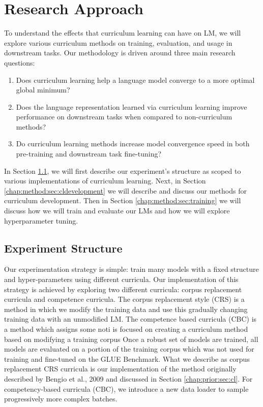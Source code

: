 \chapter{Research Approach}
\label{chap:method}
To understand the effects that curriculum learning can have on LM, we will explore various curriculum methods on training, evaluation, and usage in downstream tasks. 
Our methodology is driven around three main research questions:
\begin{enumerate}
\item Does curriculum learning help a language model converge to a more optimal global minimum? 
\item Does the language representation learned via curriculum learning improve performance on downstream tasks when compared to non-curriculum methods?
\item  Do curriculum learning methods increase model convergence speed in both pre-training and downstream task fine-tuning?
\end{enumerate}
In Section \ref{chap:method:sec:structure}, we will first describe our experiment's structure as scoped to various implementations of curriculum learning. Next, in Section \ref{chap:method:sec:cldevelopment} we will describe and discuss our methods for curriculum development. Then in Section \ref{chap:method:sec:training} we will discuss how we will train and evaluate our LMs and how we will explore hyperparameter tuning.
\section{Experiment Structure}
\label{chap:method:sec:structure}
Our experimentation strategy is simple: train many models with a fixed structure and hyper-parameters using different curricula. Our implementation of this strategy is achieved by exploring two different curricula: corpus replacement curricula and competence curricula. The corpus replacement style (CRS) is a method in which we modify the training data and use this gradually changing training data with an unmodified LM. The competence based curricula (CBC) is a method which assigns some noti   is focused on creating a curriculum method based on modifying a training corpus  Once a robust set of models are trained, all models are evaluated on a portion of the training corpus which was not used for training and fine-tuned on the GLUE Benchmark. What we describe as corpus replacement CRS  curricula is our implementation of the method originally described by Bengio et al., 2009 \cite{Bengio2009CurriculumL} and discussed in Section \ref{chap:prior:sec:cl}. For competency-based curricula (CBC), we introduce a new data loader to sample progressively more complex batches. 
